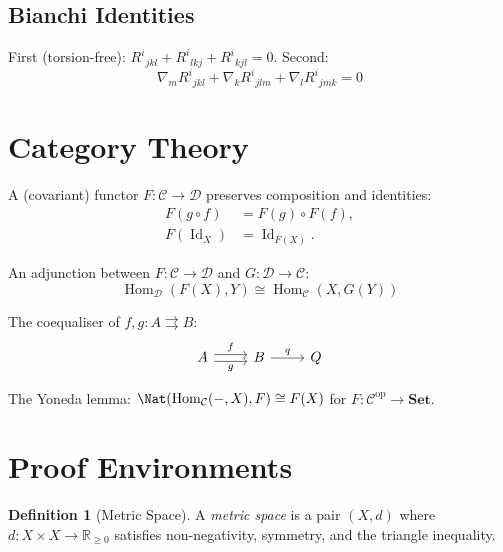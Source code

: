 \documentclass[
    language=english,
    doctype=article,
    institution=none,
    titlestyle=book,
]{../../omnilatex}
\DeclareMathOperator{\Hom}{Hom}
\DeclareMathOperator{\Id}{Id}
\theoremstyle{plain}
\theoremstyle{definition}
\newtheorem{definition}{Definition}[section]
\theoremstyle{remark}
\begin{document}
\subsection{Bianchi Identities}

First (torsion-free): $R^i{}_{jkl} + R^i{}_{lkj} + R^i{}_{kjl} = 0$. Second:
\[
    \nabla_m R^i{}_{jkl} + \nabla_k R^i{}_{jlm} + \nabla_l R^i{}_{jmk} = 0
\]

\section{Category Theory}
\label{sec:category-theory}

A (covariant) functor $F\colon \mathcal{C} \to \mathcal{D}$ preserves composition and
identities:
\begin{align}
    F(g \circ f) &= F(g) \circ F(f), \label{eq:functor-comp}\\
    F(\Id_X) &= \Id_{F(X)}. \label{eq:functor-id}
\end{align}

An adjunction between $F\colon \mathcal{C} \to \mathcal{D}$ and
$G\colon \mathcal{D} \to \mathcal{C}$:
\[
    \Hom_{\mathcal{D}}(F(X), Y) \cong \Hom_{\mathcal{C}}(X, G(Y))
\]

The coequaliser of $f, g\colon A \rightrightarrows B$:
\[
    \begin{tikzcd}
        A \arrow[r, shift left, "f"] \arrow[r, shift right, "g"'] &
        B \arrow[r, "q"] & Q
    \end{tikzcd}
\]

The Yoneda lemma: $\Nat(\Hom_{\mathcal{C}}(-, X), F) \cong F(X)$ for
$F\colon \mathcal{C}^{\mathrm{op}} \to \mathbf{Set}$.

\section{Proof Environments}
\label{sec:proof-environments}

\begin{definition}[Metric Space]\label{def:metric}
A \emph{metric space} is a pair $(X, d)$ where $d\colon X \times X \to \mathbb{R}_{\geq 0}$ satisfies
non-negativity, symmetry, and the triangle inequality.
\end{definition}
\end{document}

